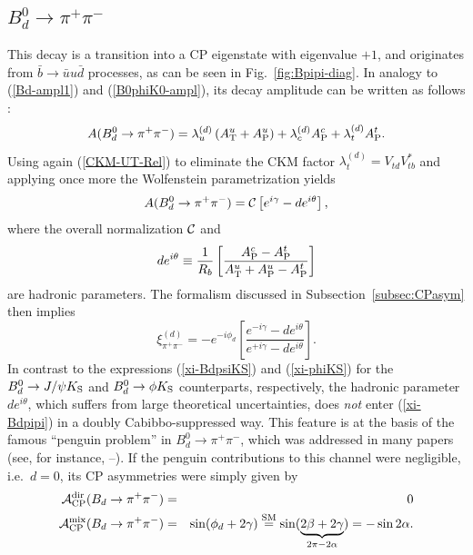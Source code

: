 \documentclass[11pt]{cernrep}
\begin{document}
%
%
%
\boldmath
\subsection{$B^0_d\to \pi^+\pi^-$}\label{ssec:Bpi+pi-}
\unboldmath
%
%
%
This decay is a transition into a CP eigenstate with eigenvalue $+1$, and 
originates from $\bar b\to\bar u u \bar d$ processes, as can be seen in 
Fig.~\ref{fig:Bpipi-diag}. In analogy to (\ref{Bd-ampl1}) and (\ref{B0phiK0-ampl}), 
its decay amplitude can be written as follows \cite{RF-BsKK}:
\begin{equation}
A(B_d^0\to\pi^+\pi^-)=
\lambda_u^{(d)}\left(A_{\rm T}^{u}+
A_{\rm P}^{u}\right)+\lambda_c^{(d)}A_{\rm P}^{c}+
\lambda_t^{(d)}A_{\rm P}^{t}.
\end{equation}
Using again (\ref{CKM-UT-Rel}) to eliminate the CKM factor 
$\lambda_t^{(d)}=V_{td}V_{tb}^\ast$ and applying once more the 
Wolfenstein parametrization yields
\begin{equation}\label{Bpipi-ampl}
A(B_d^0\to\pi^+\pi^-)={\cal C}\left[e^{i\gamma}-de^{i\theta}\right],
\end{equation}
where the overall normalization ${\cal C}$ and
\begin{equation}\label{D-DEF}
d e^{i\theta}\equiv\frac{1}{R_b}
\left[\frac{A_{\rm P}^{c}-A_{\rm P}^{t}}{A_{\rm T}^{u}+
A_{\rm P}^{u}-A_{\rm P}^{t}}\right]
\end{equation}
are hadronic parameters. 
The formalism discussed in Subsection~\ref{subsec:CPasym} then implies 
\begin{equation}\label{xi-Bdpipi}
\xi_{\pi^+\pi^-}^{(d)}=-e^{-i\phi_d}\left[\frac{e^{-i\gamma}-
d e^{i\theta}}{e^{+i\gamma}-d e^{i\theta}}\right].
\end{equation}
In contrast to the expressions (\ref{xi-BdpsiKS}) and (\ref{xi-phiKS}) 
for the $B_d^0\to J/\psi K_{\rm S}$ and $B^0_d\to\phi K_{\rm S}$ counterparts,
respectively, the hadronic parameter $d e^{i\theta}$, which suffers from large 
theoretical uncertainties, does {\it not} enter  (\ref{xi-Bdpipi}) 
in a doubly Cabibbo-suppressed way. This feature is at the basis of the
famous ``penguin problem'' in $B^0_d\to\pi^+\pi^-$, which was addressed
in many papers (see, for instance, \cite{GL}--\cite{GLSS}). If the penguin 
contributions to this channel were negligible, i.e.\ $d=0$, its CP asymmetries 
were simply given by
\begin{eqnarray}
{\cal A}_{\rm CP}^{\rm dir}(B_d\to\pi^+\pi^-)&=&0 \\
{\cal A}_{\rm CP}^{\rm mix}(B_d\to\pi^+\pi^-)&=&\sin(\phi_d+2\gamma)
\stackrel{\rm SM}{=}\sin(\underbrace{2\beta+2\gamma}_{2\pi-2\alpha})
=-\sin 2\alpha.
\end{eqnarray}
\end{document}
